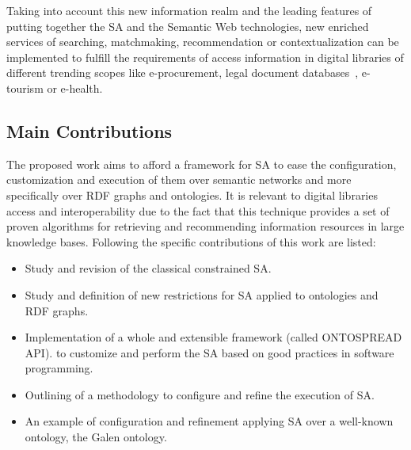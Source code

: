 Taking into account this new information realm and the leading features of putting together 
the SA and the Semantic Web technologies, new enriched services of searching, 
matchmaking, recommendation or contextualization can be implemented to fulfill the requirements
of access information in digital libraries of different trending scopes like e-procurement, 
legal document databases~\cite{bopaEstonia}, e-tourism or e-health.

\subsection{Main Contributions}
The proposed work aims to afford a framework for SA to ease the configuration, customization 
and execution of them over semantic networks and more specifically over RDF graphs and ontologies. It is relevant
to digital libraries access and interoperability due to the fact that this technique provides
a set of proven algorithms for retrieving and recommending information resources in large knowledge bases. 
Following the specific contributions of this work are listed:
\begin{itemize}
 \item Study and revision of the classical constrained SA.
 \item Study and definition of new restrictions for SA applied to ontologies and RDF graphs.
 \item Implementation of a whole and extensible framework (called ONTOSPREAD API).
to customize and perform the SA based on good practices in software programming.
\item Outlining of a methodology to configure and refine the execution of SA.
\item An example of configuration and refinement applying SA over a well-known ontology, the Galen ontology.
\end{itemize}


